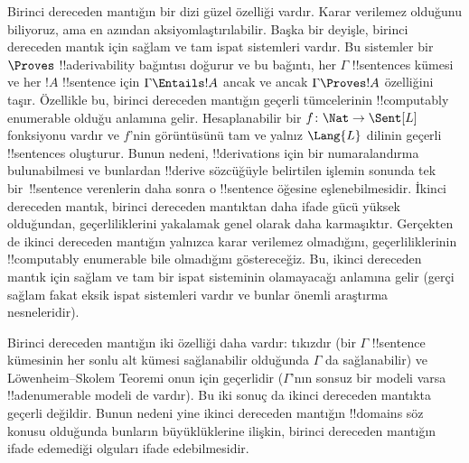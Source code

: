 



Birinci dereceden mantığın bir dizi güzel özelliği vardır. Karar verilemez
olduğunu biliyoruz, ama en azından aksiyomlaştırılabilir. Başka bir
deyişle, birinci dereceden mantık için sağlam ve tam ispat sistemleri vardır.
Bu sistemler bir $\Proves$ !!a{derivability} bağıntısı doğurur ve bu bağıntı,
her $\Gamma$ !!{sentence}s kümesi ve her $!A$ !!{sentence} için
$\Gamma\Entails !A$ ancak ve ancak $\Gamma\Proves !A$ özelliğini taşır.
Özellikle bu, birinci dereceden
mantığın geçerli tümcelerinin !!{computably
  enumerable} olduğu anlamına
gelir. Hesaplanabilir bir $f\colon\Nat\to\Sent[L]$ fonksiyonu vardır ve
$f$'nin görüntüsünü tam ve yalnız $\Lang{L}$ dilinin geçerli
!!{sentence}s oluşturur. Bunun nedeni, !!{derivation}s için bir numaralandırma
bulunabilmesi ve bunlardan !!{derive} sözcüğüyle belirtilen işlemin sonunda
tek bir~!!{sentence} verenlerin
daha sonra o !!{sentence} öğesine eşlenebilmesidir. İkinci dereceden
mantık, birinci dereceden mantıktan daha ifade gücü yüksek olduğundan,
geçerliliklerini yakalamak genel olarak daha karmaşıktır. Gerçekten de ikinci
dereceden mantığın yalnızca karar verilemez olmadığını, geçerliliklerinin
!!{computably
  enumerable} bile olmadığını göstereceğiz. Bu, ikinci dereceden
mantık için sağlam ve tam bir ispat sisteminin olamayacağı anlamına gelir
(gerçi sağlam fakat eksik ispat sistemleri vardır ve bunlar önemli araştırma
nesneleridir).

Birinci dereceden mantığın iki özelliği daha vardır: tıkızdır (bir
$\Gamma$ !!{sentence} kümesinin her sonlu alt kümesi sağlanabilir olduğunda
$\Gamma$ da sağlanabilir) ve Löwenheim--Skolem Teoremi onun için geçerlidir
($\Gamma$'nın sonsuz bir modeli varsa !!a{denumerable} modeli de vardır).
Bu iki sonuç da ikinci dereceden mantıkta geçerli değildir. Bunun nedeni yine
ikinci dereceden mantığın !!{domain}s söz konusu olduğunda bunların
büyüklüklerine ilişkin, birinci dereceden mantığın ifade edemediği olguları
ifade edebilmesidir.

